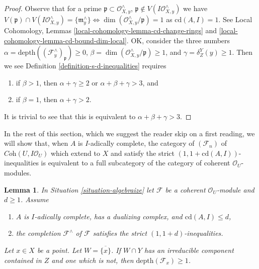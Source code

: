 \documentclass{stacks-project}
\theoremstyle{plain}
\newtheorem{lemma}[subsection]{Lemma}
\theoremstyle{definition}
\theoremstyle{remark}
\numberwithin{equation}{subsection}
\begin{document}
\begin{proof}
Observe that for a prime $\mathfrak p \subset \mathcal{O}_{X, y}^\wedge$,
$\mathfrak p \not \in V(I\mathcal{O}_{X, y}^\wedge)$
we have $V(\mathfrak p) \cap V(I\mathcal{O}_{X, y}^\wedge) =
\{\mathfrak m_y^\wedge\}
\Leftrightarrow \dim(\mathcal{O}_{X, y}^\wedge/\mathfrak p) = 1$
as $\text{cd}(A, I) = 1$.
See Local Cohomology, Lemmas
\ref{local-cohomology-lemma-cd-change-rings} and
\ref{local-cohomology-lemma-cd-bound-dim-local}.
OK, consider the three numbers
$\alpha = \text{depth}((\mathcal{F}^\wedge_y)_\mathfrak p) \geq 0$,
$\beta = \dim(\mathcal{O}_{X, y}^\wedge/\mathfrak p) \geq 1$, and
$\gamma = \delta^Y_Z(y) \geq 1$.
Then we see Definition \ref{definition-s-d-inequalities} requires
\begin{enumerate}
\item if $\beta > 1$, then
$\alpha + \gamma \geq 2$ or $\alpha + \beta + \gamma > 3$, and
\item if $\beta = 1$, then $\alpha + \gamma > 2$.
\end{enumerate}
It is trivial to see that this is equivalent to
$\alpha + \beta + \gamma > 3$.
\end{proof}

\noindent
In the rest of this section, which we suggest the reader skip on a first
reading, we will show that, when $A$ is $I$-adically complete,
the category of $(\mathcal{F}_n)$ of $\textit{Coh}(U, I\mathcal{O}_U)$
which extend to $X$ and satisfy the
strict $(1, 1 + \text{cd}(A, I))$-inequalities
is equivalent to a full subcategory of the category of coherent
$\mathcal{O}_U$-modules.

\begin{lemma}
\label{lemma-sanity}
In Situation \ref{situation-algebraize} let $\mathcal{F}$ be a
coherent $\mathcal{O}_U$-module and $d \geq 1$. Assume
\begin{enumerate}
\item $A$ is $I$-adically complete, has a dualizing complex, and
$\text{cd}(A, I) \leq d$,
\item the completion $\mathcal{F}^\wedge$ of $\mathcal{F}$
satisfies the strict $(1, 1 + d)$-inequalities.
\end{enumerate}
Let $x \in X$ be a point. Let $W = \overline{\{x\}}$.
If $W \cap Y$ has an irreducible component contained in $Z$
and one which is not, then $\text{depth}(\mathcal{F}_x) \geq 1$.
\end{lemma}
\end{document}
